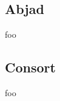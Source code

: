 \begin{singlespacing}
\vspace{-0.5\baselineskip}
\begin{multicols}{2}

\vfill
\columnbreak
\setlength\fboxsep{0pt}
\setlength\fboxrule{0.5pt}
\noindent{}
\end{multicols}
\end{singlespacing}

\subsection{Abjad}

foo

\subsection{Consort}

foo
